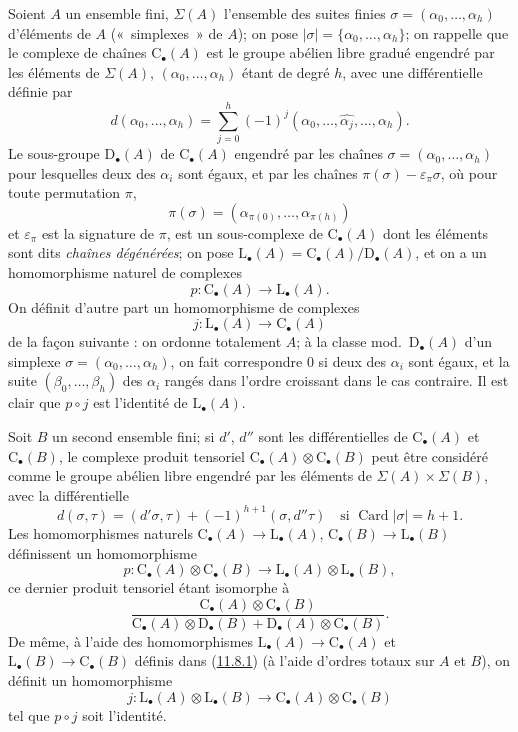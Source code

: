 \begin{env}[11.8.1]
\label{0.11.8.1-fr}
Soient $A$ un ensemble fini, $\Sigma(A)$ l'ensemble des suites finies
$\sigma=(\alpha_0,\ldots,\alpha_h)$ d'éléments de $A$ («~simplexes~» de
$A$); on pose $|\sigma|=\{\alpha_0,\ldots,\alpha_h\}$; on rappelle que le
complexe de chaînes $\mathrm C_\bullet(A)$ est le groupe abélien libre
gradué engendré par les éléments de $\Sigma(A)$,
$(\alpha_0,\ldots,\alpha_h)$ étant de degré $h$, avec une différentielle
définie par
\[
d(\alpha_0,\ldots,\alpha_h)=
\sum_{j=0}^{h}(-1)^j
(\alpha_0,\ldots,\widehat{\alpha_j},\ldots,\alpha_h).
\]
Le sous-groupe $\mathrm D_\bullet(A)$ de $\mathrm C_\bullet(A)$ engendré par
les chaînes $\sigma=(\alpha_0,\ldots,\alpha_h)$ pour lesquelles deux des
$\alpha_i$ sont égaux, et par les chaînes
$\pi(\sigma)-\varepsilon_\pi\sigma$, où pour toute permutation $\pi$,
\[
\pi(\sigma)=(\alpha_{\pi(0)},\ldots,\alpha_{\pi(h)})
\]
et $\varepsilon_\pi$ est la signature de $\pi$, est un sous-complexe de
$\mathrm C_\bullet(A)$ dont les éléments sont dits \emph{chaînes
dégénérées}; on pose
$\mathrm L_\bullet(A)=\mathrm C_\bullet(A)/\mathrm D_\bullet(A)$, et on a un
homomorphisme naturel de complexes
\[
p:\mathrm C_\bullet(A)\longrightarrow\mathrm L_\bullet(A).
\]
On définit d'autre part un homomorphisme de complexes
\[
j:\mathrm L_\bullet(A)\longrightarrow\mathrm C_\bullet(A)
\]
de la façon suivante : on ordonne totalement $A$; à la classe
mod.~$\mathrm D_\bullet(A)$ d'un simplexe
$\sigma=(\alpha_0,\ldots,\alpha_h)$, on fait correspondre $0$ si deux des
$\alpha_i$ sont égaux, et la suite $(\beta_0,\ldots,\beta_h)$ des $\alpha_i$
rangés dans l'ordre croissant dans le cas contraire. Il est clair que $p\circ
j$ est l'identité de $\mathrm L_\bullet(A)$.
\end{env}

\begin{env}[11.8.2]
\label{0.11.8.2-fr}
Soit $B$ un second ensemble fini; si $d'$, $d''$ sont les différentielles de
$\mathrm C_\bullet(A)$ et $\mathrm C_\bullet(B)$, le complexe produit
tensoriel $\mathrm C_\bullet(A)\otimes\mathrm C_\bullet(B)$ peut être
considéré comme le groupe abélien libre engendré par les éléments de
$\Sigma(A)\times\Sigma(B)$, avec la différentielle
\[
d(\sigma,\tau)=(d'\sigma,\tau)+(-1)^{h+1}(\sigma,d''\tau)
\quad\text{si }\operatorname{Card}|\sigma|=h+1.
\]
Les homomorphismes naturels
$\mathrm C_\bullet(A)\to\mathrm L_\bullet(A)$,
$\mathrm C_\bullet(B)\to\mathrm L_\bullet(B)$ définissent un homomorphisme
\[
p:\mathrm C_\bullet(A)\otimes\mathrm C_\bullet(B)
\longrightarrow\mathrm L_\bullet(A)\otimes\mathrm L_\bullet(B),
\]
ce dernier produit tensoriel étant isomorphe à
\[
\frac{\mathrm C_\bullet(A)\otimes\mathrm C_\bullet(B)}
{\mathrm C_\bullet(A)\otimes\mathrm D_\bullet(B)
+\mathrm D_\bullet(A)\otimes\mathrm C_\bullet(B)}.
\]
De même, à l'aide des homomorphismes
$\mathrm L_\bullet(A)\to\mathrm C_\bullet(A)$ et
$\mathrm L_\bullet(B)\to\mathrm C_\bullet(B)$ définis dans
(\hyperref[0.11.8.1-fr]{11.8.1}) (à l'aide d'ordres totaux sur $A$ et $B$),
on définit un homomorphisme
\[
j:\mathrm L_\bullet(A)\otimes\mathrm L_\bullet(B)
\longrightarrow\mathrm C_\bullet(A)\otimes\mathrm C_\bullet(B)
\]
tel que $p\circ j$ soit l'identité.
\end{env}

